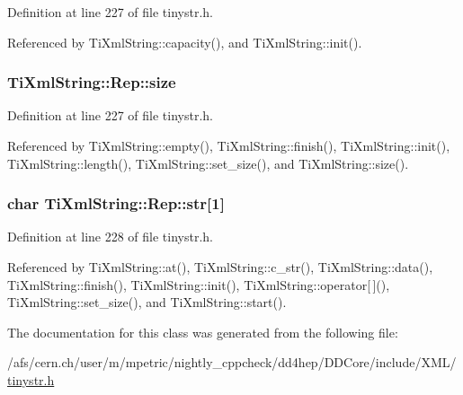 Definition at line 227 of file tinystr.h.

Referenced by TiXmlString::capacity(), and TiXmlString::init().\hypertarget{struct_ti_xml_string_1_1_rep_a3470330fe806a575dbb5909a1b908ac1}{
\subsubsection[{size}]{ {\bf TiXmlString::Rep::size}}}
\label{struct_ti_xml_string_1_1_rep_a3470330fe806a575dbb5909a1b908ac1}


Definition at line 227 of file tinystr.h.

Referenced by TiXmlString::empty(), TiXmlString::finish(), TiXmlString::init(), TiXmlString::length(), TiXmlString::set\_\-size(), and TiXmlString::size().\hypertarget{struct_ti_xml_string_1_1_rep_a88a7037a489827ec9e59b008e11342b0}{
\subsubsection[{str}]{\setlength{\rightskip}{0pt plus 5cm}char {\bf TiXmlString::Rep::str}\mbox{[}1\mbox{]}}}
\label{struct_ti_xml_string_1_1_rep_a88a7037a489827ec9e59b008e11342b0}


Definition at line 228 of file tinystr.h.

Referenced by TiXmlString::at(), TiXmlString::c\_\-str(), TiXmlString::data(), TiXmlString::finish(), TiXmlString::init(), TiXmlString::operator\mbox{[}$\,$\mbox{]}(), TiXmlString::set\_\-size(), and TiXmlString::start().

The documentation for this class was generated from the following file:\begin{DoxyCompactItemize}
\item 
/afs/cern.ch/user/m/mpetric/nightly\_\-cppcheck/dd4hep/DDCore/include/XML/\hyperlink{tinystr_8h}{tinystr.h}\end{DoxyCompactItemize}
